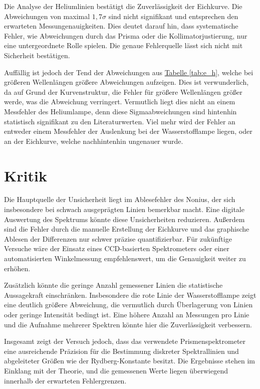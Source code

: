 Die Analyse der Heliumlinien bestätigt die Zuverlässigkeit der Eichkurve. Die Abweichungen von maximal $1,7\sigma$ sind nicht signifikant und entsprechen den erwarteten Messungenauigkeiten. Dies deutet darauf hin, dass systematische Fehler, wie Abweichungen durch das Prisma oder die Kollimatorjustierung, nur eine untergeordnete Rolle spielen. Die genaue Fehlerquelle lässt sich nicht mit Sicherheit bestätigen.

Auffällig ist jedoch der Tend der Abweichungen aus \hyperref[tab:e_h]{Tabelle \ref*{tab:e_h}}, welche bei größeren Wellenlängen größere Abweichungen aufzeigen. Dies ist verwunderlich, da auf Grund der Kurvenstruktur, die Fehler für größere Wellenlängen größer werde, was die Abweichung verringert. Vermutlich liegt dies nicht an einem Messfehler des Heliumlampe, denn diese Sigmaabweichungen sind hintenhin statistisch signifikant zu den Literaturwerten. Viel mehr wird der Fehler an entweder einem Messfehler der Auslenkung bei der Wasserstofflampe liegen, oder an der Eichkurve, welche nachhintenhin ungenauer wurde. 

\section{Kritik}

Die Hauptquelle der Unsicherheit liegt im Ablesefehler des Nonius, der sich insbesondere bei schwach ausgeprägten Linien bemerkbar macht. Eine digitale Auswertung des Spektrums könnte diese Unsicherheiten reduzieren. Außerdem sind die Fehler durch die manuelle Erstellung der Eichkurve und das graphische Ablesen der Differenzen nur schwer präzise quantifizierbar. Für zukünftige Versuche wäre der Einsatz eines CCD-basierten Spektrometers oder einer automatisierten Winkelmessung empfehlenswert, um die Genauigkeit weiter zu erhöhen.  

Zusätzlich könnte die geringe Anzahl gemessener Linien die statistische Aussagekraft einschränken. Insbesondere die rote Linie der Wasserstofflampe zeigt eine deutlich größere Abweichung, die vermutlich durch Überlagerung von Linien oder geringe Intensität bedingt ist. Eine höhere Anzahl an Messungen pro Linie und die Aufnahme mehrerer Spektren könnte hier die Zuverlässigkeit verbessern.  

Insgesamt zeigt der Versuch jedoch, dass das verwendete Prismenspektrometer eine ausreichende Präzision für die Bestimmung diskreter Spektrallinien und abgeleiteter Größen wie der Rydberg-Konstante besitzt. Die Ergebnisse stehen im Einklang mit der Theorie, und die gemessenen Werte liegen überwiegend innerhalb der erwarteten Fehlergrenzen.
